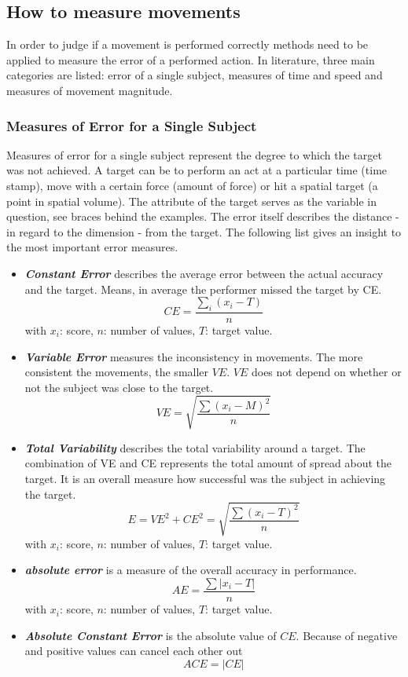 \subsection{How to measure movements}
In order to judge if a movement is performed correctly methods need to be applied to measure the error of a performed action. In literature, three main categories are listed: error of a single subject, measures of time and speed and measures of movement magnitude.
\subsubsection{Measures of Error for a Single Subject}
Measures of error for a single subject represent the degree to which the target was not achieved. A target can be to perform an act at a particular time (time stamp), move with a certain force (amount of force) or hit a spatial target (a point in spatial volume). The attribute of the target serves as the variable in question, see braces behind the examples. The error itself describes the distance - in regard to the dimension - from the target. The following list gives an insight to the most important error measures.
\begin{itemize}
	\item \textbf{\textit{Constant Error}} describes the average error between the actual accuracy and the target. Means, in average the performer missed the target by CE.
	\begin{equation}
		CE=\frac{\sum_i(x_i-T)}{n}
	\end{equation}
	\label{eq:constanterror}
	with $x_i$: score, $n$: number of values, $T$: target value.
	\item \textbf{\textit{Variable Error}} measures the inconsistency in movements. The more consistent the movements, the smaller $VE$. $VE$ does not depend on whether or not the subject was close to the target.
	\begin{equation}
		VE=\sqrt{\frac{\sum(x_i-M)^2}{n}}	
	\end{equation}
	\item \textbf{\textit{Total Variability}} describes the total variability around a target. The combination of VE and CE represents the total amount of spread about the target. It is an overall measure how successful was the subject in achieving the target.
	\begin{equation}
		E=VE^2+CE^2=\sqrt{\frac{\sum(x_i-T)^2}{n}}
	\end{equation}
	with $x_i$: score, $n$: number of values, $T$: target value.
	\item \textbf{\textit{absolute error}} is a measure of the overall accuracy in performance.
	\begin{equation}
		AE=\frac{\sum|x_i-T|}{n}
	\end{equation}
	with $x_i$: score, $n$: number of values, $T$: target value.
	\item \textbf{\textit{Absolute Constant Error}} is the absolute value of $CE$. Because of negative and positive values can cancel each other out
	\begin{equation}
		ACE = |CE|
	\end{equation}
\end{itemize}
